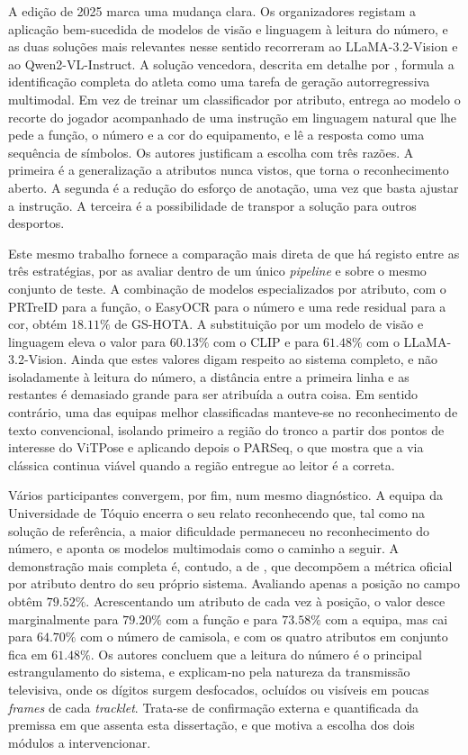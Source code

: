 A edição de 2025 marca uma mudança clara. Os organizadores registam a aplicação
bem-sucedida de modelos de visão e linguagem à leitura do número, e as duas soluções mais
relevantes nesse sentido recorreram ao LLaMA-3.2-Vision e ao Qwen2-VL-Instruct. A solução
vencedora, descrita em detalhe por \citet{oo2026broadcast2pitch}, formula a identificação
completa do atleta como uma tarefa de geração autorregressiva multimodal. Em vez de treinar
um classificador por atributo, entrega ao modelo o recorte do jogador acompanhado de uma
instrução em linguagem natural que lhe pede a função, o número e a cor do equipamento, e lê
a resposta como uma sequência de símbolos. Os autores justificam a escolha com três razões.
A primeira é a generalização a atributos nunca vistos, que torna o reconhecimento aberto. A
segunda é a redução do esforço de anotação, uma vez que basta ajustar a instrução. A terceira é a
possibilidade de transpor a solução para outros desportos.

Este mesmo trabalho fornece a comparação mais direta de que há registo entre as três
estratégias, por as avaliar dentro de um único \emph{pipeline} e sobre o mesmo conjunto de
teste. A combinação de modelos especializados por atributo, com o PRTreID para a função, o
EasyOCR para o número e uma rede residual para a cor, obtém $18{.}11\%$ de GS-HOTA. A
substituição por um modelo de visão e linguagem eleva o valor para $60{.}13\%$ com o CLIP e
para $61{.}48\%$ com o LLaMA-3.2-Vision. Ainda que estes valores digam respeito ao sistema
completo, e não isoladamente à leitura do número, a distância entre a primeira linha e as
restantes é demasiado grande para ser atribuída a outra coisa. Em sentido contrário, uma
das equipas melhor classificadas manteve-se no reconhecimento de texto convencional,
isolando primeiro a região do tronco a partir dos pontos de interesse do ViTPose e
aplicando depois o PARSeq, o que mostra que a via clássica continua viável quando a região
entregue ao leitor é a correta.

Vários participantes convergem, por fim, num mesmo diagnóstico. A equipa da Universidade de
Tóquio encerra o seu relato reconhecendo que, tal como na solução de referência, a maior
dificuldade permaneceu no reconhecimento do número, e aponta os modelos multimodais como o
caminho a seguir. A demonstração mais completa é, contudo, a de \citet{oo2026broadcast2pitch},
que decompõem a métrica oficial por atributo dentro do seu próprio sistema. Avaliando apenas
a posição no campo obtêm $79{.}52\%$. Acrescentando um atributo de cada vez à posição, o
valor desce marginalmente para $79{.}20\%$ com a função e para $73{.}58\%$ com a equipa, mas
cai para $64{.}70\%$ com o número de camisola, e com os quatro atributos em conjunto fica em
$61{.}48\%$. Os autores concluem que a leitura do número é o principal estrangulamento do
sistema, e explicam-no pela natureza da transmissão televisiva,
onde os dígitos surgem desfocados, ocluídos ou visíveis em poucas \emph{frames} de cada
\emph{tracklet}. Trata-se de confirmação externa e quantificada da premissa em que assenta
esta dissertação, e que motiva a escolha dos dois módulos a intervencionar.

